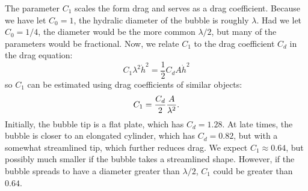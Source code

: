The parameter $C_1$ scales the form drag and serves as a drag coefficient.  
Because we have let $C_0 = 1$, the hydralic diameter of the bubble is roughly $\lambda$.
Had we let $C_0 = 1/4$, the diameter would be the more common $\lambda/2$, but many of the parameters would be fractional.
Now, we relate $C_1$ to the drag coefficient $C_d$ in the drag equation:
\begin{equation}
C_1 \lambda^2 \dot{h}^2 = \frac{1}{2} C_d A \dot{h}^2
\end{equation}
so $C_1$ can be estimated using drag coefficients of similar objects:
\begin{equation} \elabel{prior_c1}
C_1 = \frac{C_d}{2} \frac{A}{\lambda^2}.
\end{equation}
Initially, the bubble tip is a flat plate, which has $C_d = 1.28$.
At late times, the bubble is closer to an elongated cylinder, which has $C_d = 0.82$, but with a somewhat streamlined tip, which further reduces drag.
We expect $C_1 \approx 0.64$, but possibly much smaller if the bubble takes a streamlined shape.
However, if the bubble spreads to have a diameter greater than $\lambda / 2$, $C_1$ could be greater than $0.64$.

